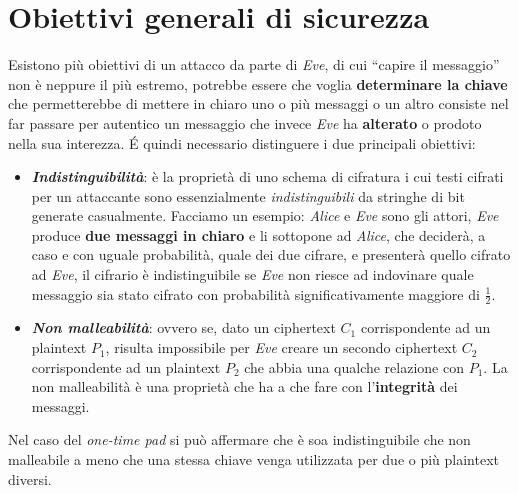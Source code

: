 \section{Obiettivi generali di sicurezza}
Esistono più obiettivi di un attacco da parte di \textit{Eve}, di cui ``capire il messaggio'' non è neppure il più estremo, potrebbe essere che voglia \textbf{determinare la chiave} che permetterebbe di mettere in chiaro uno o più messaggi o un altro consiste nel far passare per autentico un messaggio che invece \textit{Eve} ha \textbf{alterato} o prodoto nella sua interezza. \'{E} quindi necessario distinguere i due principali obiettivi:
\begin{itemize}
    \item \textbf{\textit{Indistinguibilità}}: è la proprietà di uno schema di cifratura i cui testi cifrati per un attaccante sono essenzialmente \textit{indistinguibili} da stringhe di bit generate casualmente. Facciamo un esempio: \textit{Alice} e \textit{Eve} sono gli attori, \textit{Eve} produce \textbf{due messaggi in chiaro} e li sottopone ad \textit{Alice}, che deciderà, a caso e con uguale probabilità, quale dei due cifrare, e presenterà quello cifrato ad \textit{Eve}, il cifrario è indistinguibile se \textit{Eve} non riesce ad indovinare quale messaggio sia stato cifrato con probabilità significativamente maggiore di $\frac{1}{2}$.
    \item \textbf{\textit{Non malleabilità}}: ovvero se, dato un ciphertext \textit{$C_1$} corrispondente ad un plaintext \textit{$P_1$}, risulta impossibile per \textit{Eve} creare un secondo ciphertext \textit{$C_2$} corrispondente ad un plaintext \textit{$P_2$} che abbia una qualche relazione con \textit{$P_1$}. La non malleabilità è una proprietà che ha a che fare con l'\textbf{integrità} dei messaggi.
\end{itemize}
Nel caso del \textit{one-time pad} si può affermare che è soa indistinguibile che non malleabile a meno che una stessa chiave venga utilizzata per due o più plaintext diversi.

\newpage
